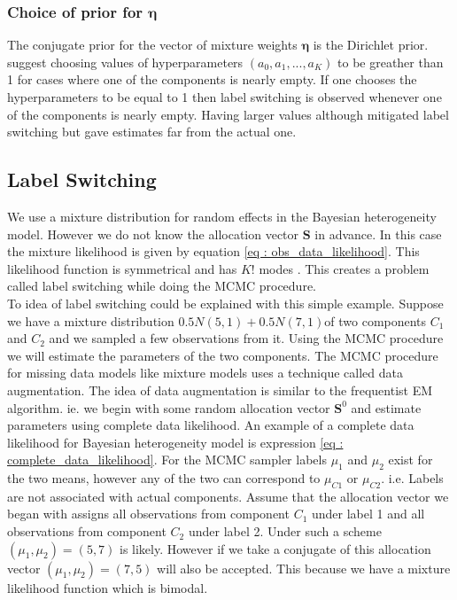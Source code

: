 \subsubsection{Choice of prior for $\boldsymbol{\eta}$}
The conjugate prior for the vector of mixture weights $\boldsymbol{\eta}$ is the Dirichlet prior. \citet{fruhwirth-schnatter_finite_2013} suggest choosing values of hyperparameters $(a_0, a_1,..., a_K)$ to be greather than 1 for cases where one of the components is nearly empty. If one chooses the hyperparameters to be equal to 1 then label switching is observed whenever one of the components is nearly empty. Having larger values although mitigated label switching but gave estimates far from the actual one. 

\subsection{Label Switching}
We use a mixture distribution for random effects in the Bayesian heterogeneity model. However we do not know the allocation vector $\boldsymbol{S}$ in advance. In this case the mixture likelihood is given by equation \ref{eq : obs_data_likelihood}. This likelihood function is symmetrical and has $K!$ modes \citep[pg. 44]{fruhwirth-schnatter_finite_2013}. This creates a problem called label switching while doing the MCMC procedure.\\

To idea of label switching could be explained with this simple example. Suppose we have a mixture distribution $0.5N(5,1) + 0.5N(7,1)$of two components $C_1$ and $C_2$ and we sampled a few observations from it. Using the MCMC procedure we will estimate the parameters of the two components. The MCMC procedure for missing data models like mixture models uses a technique called data augmentation. The idea of data augmentation is similar to the frequentist EM algorithm. ie. we begin with some random allocation vector $\boldsymbol{S}^0$ and estimate parameters using complete data likelihood. An example of a complete data likelihood for Bayesian heterogeneity model is expression \ref{eq : complete_data_likelihood}. For the MCMC sampler labels $\mu_1$ and $\mu_2$ exist for the two means, however any of the two can correspond to $\mu_{C1}$ or $\mu_{C2}$. i.e. Labels are not associated with actual components. Assume that the allocation vector we began with assigns all observations from component $C_1$ under label 1 and all observations from component $C_2$ under label 2. Under such a scheme $(\mu_1,\mu_2) = (5,7)$ is likely. However if we take a conjugate of this allocation vector $(\mu_1,\mu_2) = (7,5)$ will also be accepted. This because we have a mixture likelihood function which is bimodal.\\

